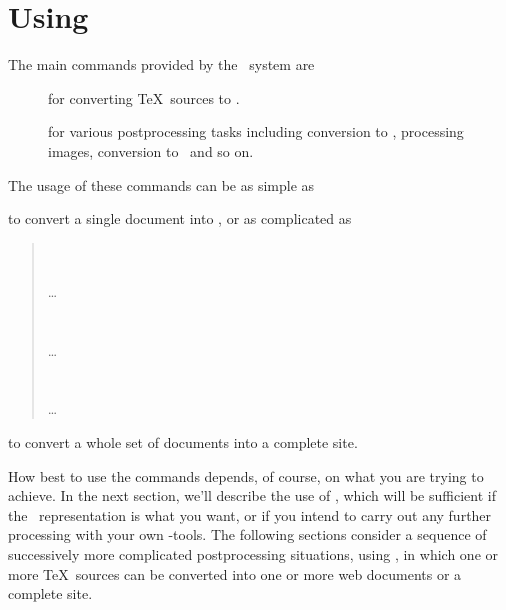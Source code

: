 \documentclass{report}
\begin{document}
\chapter{Using \LaTeXML}\label{usage}
The main commands provided by the \LaTeXML\ system are
\begin{description}
\item[] for converting \TeX\ sources to \XML.
\item[] for various postprocessing tasks including
conversion to \HTML, processing images, conversion to \MathML\ and so on.
\end{description}
The usage of these commands can be as simple as
\begin{quote}
\end{quote}
to convert a single document into \HTML,  or as complicated as
\begin{quote}
 \\
 \\
  \hbox{}\hspace{1in}\ldots\\
 \\
 \\
  \hbox{}\hspace{1in}\ldots\\
 \\
 \\
  \hbox{}\hspace{1in}\ldots
\end{quote}
to convert a whole set of documents into a complete site.

How best to use the commands depends, of course, on what you
are trying to achieve.  In the next section, we'll describe
the use of , which will be sufficient
if the \XML\ representation is what you want, or if you
intend to carry out any further processing with your own
\XML-tools.  The following sections consider a sequence of
successively more complicated postprocessing situations,
using ,
in which one or more \TeX\ sources can be converted into
one or more web documents or a complete site.
\end{document}
